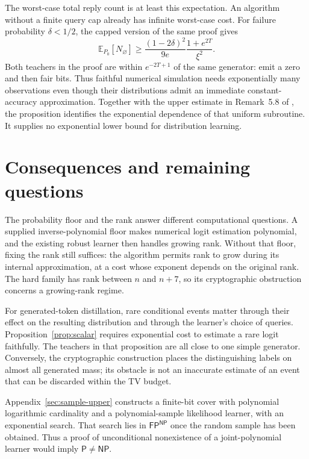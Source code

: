 \documentclass[11pt]{article}
\theoremstyle{definition}
\theoremstyle{remark}
\begin{document}
The worst-case total reply count is at least this expectation. An algorithm without a finite query cap already has infinite worst-case cost. For failure probability $\delta<1/2$, the capped version of the same proof gives
\[
\mathbb E_{P_0}[N_{\varnothing}]
\ge\frac{(1-2\delta)^2}{9e}\frac{1+e^{2T}}{\xi^2}.
\]
Both teachers in the proof are within $e^{-2T+1}$ of the same generator: emit a zero and then fair bits. Thus faithful numerical simulation needs exponentially many observations even though their distributions admit an immediate constant-accuracy approximation. Together with the upper estimate in Remark~5.8 of \citet{gls2}, the proposition identifies the exponential dependence of that uniform subroutine. It supplies no exponential lower bound for distribution learning.


\section{Consequences and remaining questions}\label{sec:discussion}

The probability floor and the rank answer different computational questions. A supplied inverse-polynomial floor makes numerical logit estimation polynomial, and the existing robust learner then handles growing rank. Without that floor, fixing the rank still suffices: the algorithm permits rank to grow during its internal approximation, at a cost whose exponent depends on the original rank. The hard family has rank between $n$ and $n+7$, so its cryptographic obstruction concerns a growing-rank regime.

For generated-token distillation, rare conditional events matter through their effect on the resulting distribution and through the learner's choice of queries. Proposition~\ref{prop:scalar} requires exponential cost to estimate a rare logit faithfully. The teachers in that proposition are all close to one simple generator. Conversely, the cryptographic construction places the distinguishing labels on almost all generated mass; its obstacle is not an inaccurate estimate of an event that can be discarded within the TV budget.

Appendix~\ref{sec:sample-upper} constructs a finite-bit cover with polynomial logarithmic cardinality and a polynomial-sample likelihood learner, with an exponential search. That search lies in $\mathsf{FP}^{\mathsf{NP}}$ once the random sample has been obtained. Thus a proof of unconditional nonexistence of a joint-polynomial learner would imply $\mathsf P\ne\mathsf{NP}$.
\end{document}
